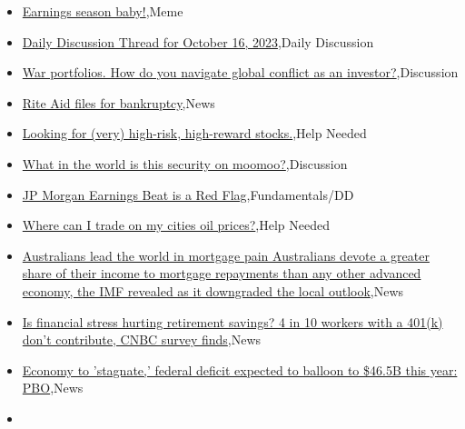 \documentclass{article}%
\begin{document}
%
\begin{itemize}%
\item%
\href{https://reddit.com/r/wallstreetbets/comments/17931v9/earnings\_season\_baby/}{Earnings season baby!},Meme%
\item%
\href{https://reddit.com/r/wallstreetbets/comments/1792gj0/daily\_discussion\_thread\_for\_october\_16\_2023/}{Daily Discussion Thread for October 16, 2023},Daily Discussion%
\item%
\href{https://reddit.com/r/wallstreetbets/comments/17928vz/war\_portfolios\_how\_do\_you\_navigate\_global/}{War portfolios. How do you navigate global conflict as an investor?},Discussion%
\item%
\href{https://reddit.com/r/StockMarket/comments/178vmc5/rite\_aid\_files\_for\_bankruptcy/}{Rite Aid files for bankruptcy},News%
\item%
\href{https://reddit.com/r/StockMarket/comments/178cf11/looking\_for\_very\_highrisk\_highreward\_stocks/}{Looking for (very) high-risk, high-reward stocks.},Help Needed%
\item%
\href{https://reddit.com/r/StockMarket/comments/17839r0/what\_in\_the\_world\_is\_this\_security\_on\_moomoo/}{What in the world is this security on moomoo?},Discussion%
\item%
\href{https://reddit.com/r/StockMarket/comments/17828jm/jp\_morgan\_earnings\_beat\_is\_a\_red\_flag/}{JP Morgan Earnings Beat is a Red Flag},Fundamentals/DD%
\item%
\href{https://reddit.com/r/StockMarket/comments/177eott/where\_can\_i\_trade\_on\_my\_cities\_oil\_prices/}{Where can I trade on my cities oil prices?},Help Needed%
\item%
\href{https://reddit.com/r/Economics/comments/178rvri/australians\_lead\_the\_world\_in\_mortgage\_pain/}{Australians lead the world in mortgage pain  Australians devote a greater share of their income to mortgage repayments than any other advanced economy, the IMF revealed as it downgraded the local outlook},News%
\item%
\href{https://reddit.com/r/Economics/comments/178rosm/is\_financial\_stress\_hurting\_retirement\_savings\_4/}{Is financial stress hurting retirement savings? 4 in 10 workers with a 401(k) don't contribute, CNBC survey finds},News%
\item%
\href{https://reddit.com/r/Economics/comments/178pw8r/economy\_to\_stagnate\_federal\_deficit\_expected\_to/}{Economy to 'stagnate,' federal deficit expected to balloon to \$46.5B this year: PBO},News%
\item%

\end{itemize}
\end{document}
